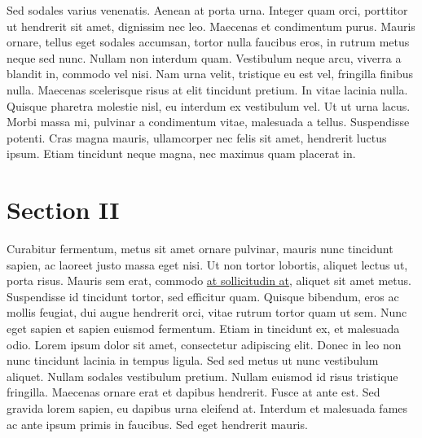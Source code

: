\documentclass{book}
\begin{document}
            Sed sodales varius venenatis. Aenean at porta urna. Integer quam orci, porttitor ut
               hendrerit sit amet, dignissim nec leo. Maecenas et condimentum purus. Mauris ornare,
               tellus eget sodales accumsan, tortor nulla faucibus eros, in rutrum metus neque sed
               nunc. Nullam non interdum quam. Vestibulum neque arcu, viverra a blandit in, commodo
               vel nisi. Nam urna velit, tristique eu est vel, fringilla finibus nulla. Maecenas
               scelerisque risus at elit tincidunt pretium. In vitae lacinia nulla. Quisque pharetra
               molestie nisl, eu interdum ex vestibulum vel. Ut ut urna lacus. Morbi massa mi,
               pulvinar a condimentum vitae, malesuada a tellus. Suspendisse potenti. Cras magna
               mauris, ullamcorper nec felis sit amet, hendrerit luctus ipsum. Etiam tincidunt neque
               magna, nec maximus quam placerat in.
         
      
   
      
         
            
\section{Section II}\label{section2}

            Curabitur fermentum, metus sit amet ornare pulvinar, mauris nunc tincidunt sapien,
               ac laoreet justo massa eget nisi. Ut non tortor lobortis, aliquet lectus ut, porta
               risus. Mauris sem erat, commodo \hyperref[section3]{at sollicitudin at}, aliquet sit amet metus.
               Suspendisse id tincidunt tortor, sed efficitur quam. Quisque bibendum, eros ac mollis
               feugiat, dui augue hendrerit orci, vitae rutrum tortor quam ut sem. Nunc eget sapien
               et sapien euismod fermentum. Etiam in tincidunt ex, et malesuada odio.
            Lorem ipsum dolor sit amet, consectetur adipiscing elit. Donec in leo non nunc
               tincidunt lacinia in tempus ligula. Sed sed metus ut nunc vestibulum aliquet. Nullam
               sodales vestibulum pretium. Nullam euismod id risus tristique fringilla. Maecenas
               ornare erat et dapibus hendrerit. Fusce at ante est. Sed gravida lorem sapien, eu
               dapibus urna eleifend at. Interdum et malesuada fames ac ante ipsum primis in
               faucibus. Sed eget hendrerit mauris.
            
\end{document}

